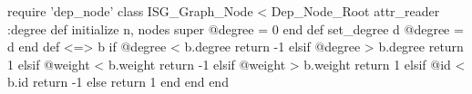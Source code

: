 \begin{rubyblock}
require 'dep_node'
class ISG_Graph_Node < Dep_Node_Root
  attr_reader :degree
  def initialize n, nodes
    super
    @degree = 0
  end
  def set_degree d
    @degree = d
  end
  def <=> b
    if @degree < b.degree
      return -1
    elsif @degree > b.degree
      return 1
    elsif @weight < b.weight
      return -1
    elsif @weight > b.weight
      return 1
    elsif @id < b.id
      return -1
    else
      return 1
    end
  end
end
\end{rubyblock}
